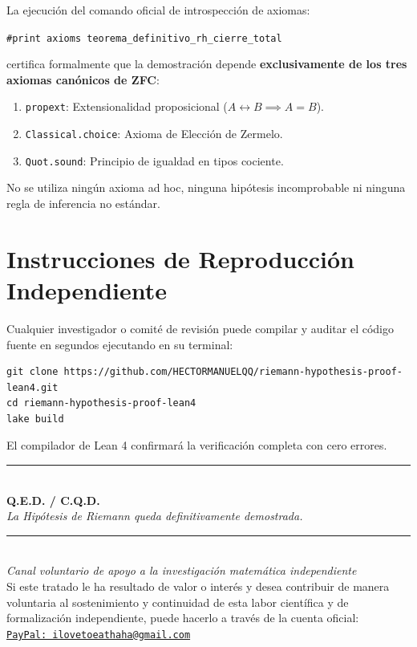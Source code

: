 \documentclass[11pt,a4paper]{article}
\theoremstyle{definition}
\theoremstyle{remark}
\begin{document}
La ejecución del comando oficial de introspección de axiomas:
\begin{center}
\texttt{\#print axioms teorema\_definitivo\_rh\_cierre\_total}
\end{center}
certifica formalmente que la demostración depende \textbf{exclusivamente de los tres axiomas canónicos de ZFC}:
\begin{enumerate}
    \item \texttt{propext}: Extensionalidad proposicional ($A \leftrightarrow B \implies A = B$).
    \item \texttt{Classical.choice}: Axioma de Elección de Zermelo.
    \item \texttt{Quot.sound}: Principio de igualdad en tipos cociente.
\end{enumerate}
No se utiliza ningún axioma ad hoc, ninguna hipótesis incomprobable ni ninguna regla de inferencia no estándar.

\section{Instrucciones de Reproducción Independiente}

Cualquier investigador o comité de revisión puede compilar y auditar el código fuente en segundos ejecutando en su terminal:
\begin{verbatim}
git clone https://github.com/HECTORMANUELQQ/riemann-hypothesis-proof-lean4.git
cd riemann-hypothesis-proof-lean4
lake build
\end{verbatim}
El compilador de Lean 4 confirmará la verificación completa con cero errores.

\vspace{2.5em}
\begin{center}
\rule{0.6\textwidth}{0.4pt}\\[1em]
\textbf{\large Q.E.D. / C.Q.D.}\\[0.5em]
\textit{La Hipótesis de Riemann queda definitivamente demostrada.}
\end{center}

\vspace{3.5em}
\begin{center}
\footnotesize\color{gray!60!black}
\rule{0.3\textwidth}{0.2pt}\\[0.6em]
\textit{Canal voluntario de apoyo a la investigación matemática independiente}\\[0.3em]
Si este tratado le ha resultado de valor o interés y desea contribuir de manera voluntaria al sostenimiento y continuidad de esta labor científica y de formalización independiente, puede hacerlo a través de la cuenta oficial:\\
\href{mailto:ilovetoeathaha@gmail.com}{\texttt{PayPal: ilovetoeathaha@gmail.com}}\\[0.2em]
\end{center}
\end{document}
